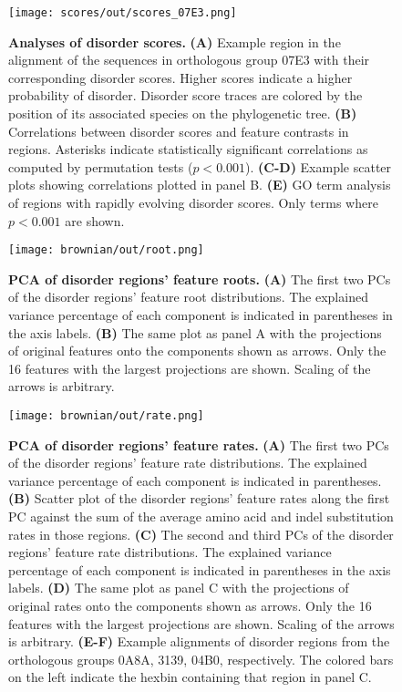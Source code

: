 \begin{figure}[h!]
\texttt{[image: scores/out/scores\_07E3.png]}
\centering
\caption{\textbf{Analyses of disorder scores.}
\textbf{(A)} Example region in the alignment of the sequences in orthologous group 07E3 with their corresponding disorder scores. Higher scores indicate a higher probability of disorder. Disorder score traces are colored by the position of its associated species on the phylogenetic tree. \textbf{(B)} Correlations between disorder scores and feature contrasts in regions. Asterisks indicate statistically significant correlations as computed by permutation tests ($p < 0.001$). \textbf{(C-D)} Example scatter plots showing correlations plotted in panel B. \textbf{(E)} GO term analysis of regions with rapidly evolving disorder scores. Only terms where $p < 0.001$ are shown.}
\label{fig:scores}
\end{figure}

\begin{figure}[h!]
\texttt{[image: brownian/out/root.png]}
\centering
\caption{\textbf{PCA of disorder regions' feature roots.}
\textbf{(A)} The first two PCs of the disorder regions' feature root distributions. The explained variance percentage of each component is indicated in parentheses in the axis labels. \textbf{(B)} The same plot as panel A with the projections of original features onto the components shown as arrows. Only the 16 features with the largest projections are shown. Scaling of the arrows is arbitrary.}
\label{fig:root}
\end{figure}

\begin{figure}[h!]
\texttt{[image: brownian/out/rate.png]}
\centering
\caption{\textbf{PCA of disorder regions' feature rates.}
\textbf{(A)} The first two PCs of the disorder regions' feature rate distributions. The explained variance percentage of each component is indicated in parentheses. \textbf{(B)} Scatter plot of the disorder regions' feature rates along the first PC against the sum of the average amino acid and indel substitution rates in those regions. \textbf{(C)} The second and third PCs of the disorder regions' feature rate distributions. The explained variance percentage of each component is indicated in parentheses in the axis labels. \textbf{(D)} The same plot as panel C with the projections of original rates onto the components shown as arrows. Only the 16 features with the largest projections are shown. Scaling of the arrows is arbitrary. \textbf{(E-F)} Example alignments of disorder regions from the orthologous groups 0A8A, 3139, 04B0, respectively. The colored bars on the left indicate the hexbin containing that region in panel C.}
\label{fig:rate}
\end{figure}

